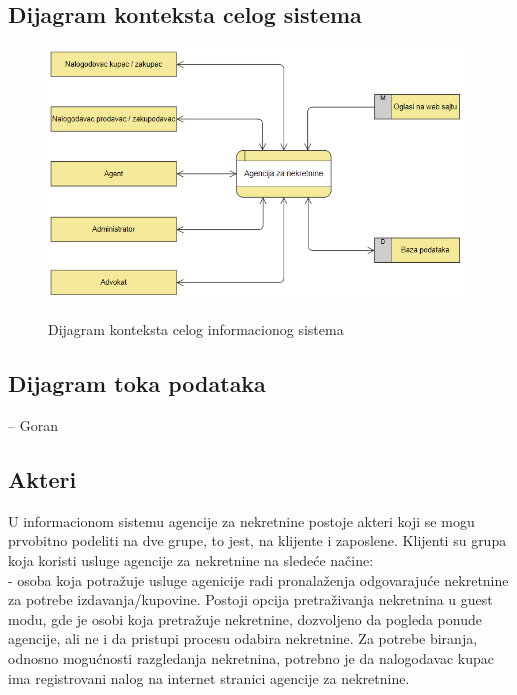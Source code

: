 \documentclass{article}
\begin{document}
\subsection{\bfseries Dijagram konteksta celog sistema}
\begin{figure}[h]
		\centering
		\includegraphics[width=0.98\textwidth,height=0.5\textheight]{Pictures/DijagramKontekstaCelogSistema}\\
		\caption{Dijagram konteksta celog informacionog sistema}
		\label{fig:dijagramKontekstaCelogIS}
	\end{figure}

\newpage
\subsection{\bfseries Dijagram toka podataka}
-- Goran

\newpage
\subsection{\bfseries Akteri}

\indent U informacionom sistemu agencije za nekretnine postoje akteri koji se mogu prvobitno podeliti na dve grupe, to jest, na klijente i zaposlene. Klijenti su grupa koja koristi usluge agencije za nekretnine na slede\' ce na\v {c}ine:\\

 - osoba koja potra\v {z}uje usluge agenicije radi pronala\v {z}enja odgovaraju\' ce nekretnine za potrebe izdavanja/kupovine. Postoji opcija pretra\v {z}ivanja nekretnina u guest modu, gde je osobi koja pretra\v {z}uje nekretnine, dozvoljeno da pogleda ponude agencije, ali ne i da pristupi procesu odabira nekretnine. Za potrebe biranja, odnosno mogu\' cnosti razgledanja nekretnina, potrebno je da nalogodavac kupac ima registrovani nalog na internet stranici agencije za nekretnine.\\
\end{document}
